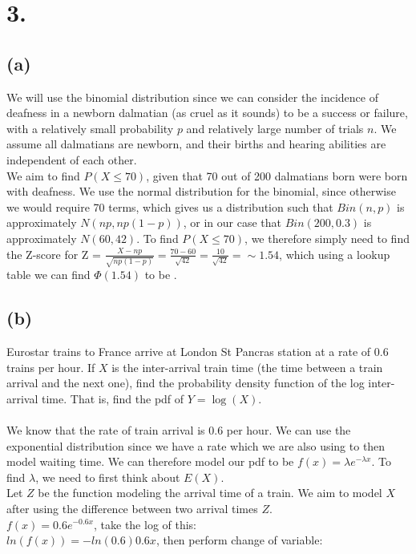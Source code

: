 \documentclass{article}
\begin{document}
\section*{3.}
{\Large

\subsection*{(a)}
We will use the binomial distribution since we can consider the incidence of deafness in a newborn dalmatian (as cruel as it sounds) to be a success or failure, with a relatively small probability $p$ and relatively large number of trials $n$. We assume all dalmatians are newborn, and their births and hearing abilities are independent of each other. \\
We aim to find $P(X \leq 70)$, given that 70 out of 200 dalmatians born were born with deafness. We use the normal distribution for the binomial, since otherwise we would require 70 terms, which gives us a distribution such that $Bin(n,p)$ is approximately $N(np, np(1-p))$, or in our case that $Bin(200, 0.3)$ is approximately $N(60, 42)$. To find $P(X \leq 70)$, we therefore simply need to find the Z-score for Z = $\frac{X - np}{\sqrt{np(1-p)}} = \frac{70-60}{\sqrt{42}} = \frac{10}{\sqrt{42}} = \sim 1.54$, which using a lookup table we can find $\Phi(1.54)$ to be .

\subsection*{(b)}
Eurostar trains to France arrive at London St Pancras station at a rate of $0.6$ trains per  hour. If $X$ is the inter-arrival train time (the time between a train arrival and the next one), find the probability density function of the log inter-arrival time. That is, find the pdf of $Y=\log(X).$ \\ \\
We know that the rate of train arrival is 0.6 per hour. We can use the exponential distribution since we have a rate which we are also using to then model waiting time. We can therefore model our pdf to be $f(x) = \lambda e^{-\lambda x}$. To find $\lambda$, we need to first think about $E(X)$. \\ 
Let $Z$ be the function modeling the arrival time of a train. We aim to model $X$ after using the difference between two arrival times $Z$. \\ 
$f(x) = 0.6e^{-0.6x}$, take the log of this: \\ 
$ln(f(x)) = -ln(0.6)0.6x$, then perform change of variable: \\ 

}
\end{document}
